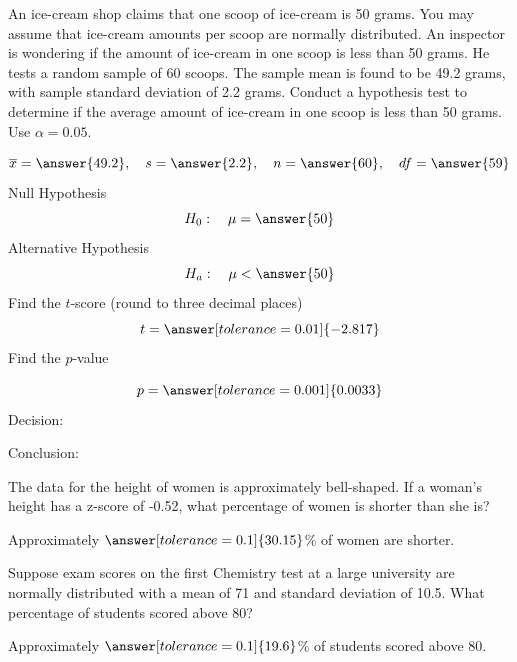 \documentclass{ximera}
\begin{document}
\begin{problem}\label{prob:140finalprob8}
An ice-cream shop claims that one scoop of ice-cream is 50 grams.  You may assume that ice-cream amounts per scoop are normally distributed.  An inspector is wondering if the amount of ice-cream in one scoop is less than 50 grams.  He tests a random sample of 60 scoops.  The sample mean is found to be 49.2 grams, with sample standard deviation of 2.2 grams.  Conduct a hypothesis test to determine if the average amount of ice-cream in one scoop is less than 50 grams.  Use $\alpha=0.05$.

$$\overline{x}=\answer{49.2},\quad s=\answer{2.2},\quad n=\answer{60},\quad df=\answer{59}$$
Null Hypothesis
$$H_0:\quad \mu=\answer{50}$$
Alternative Hypothesis
$$H_a:\quad \mu<\answer{50}$$
Find the $t$-score (round to three decimal places)
$$t=\answer[tolerance=0.01]{-2.817}$$
Find the $p$-value
\begin{center}  
\end{center}
$$p=\answer[tolerance=0.001]{0.0033}$$
Decision:

\begin{multipleChoice} 
\end{multipleChoice}  

Conclusion:

\begin{multipleChoice} 
\end{multipleChoice} 
\end{problem}

\begin{problem}\label{prob:140finalprob9}
The data for the height of women is approximately bell-shaped.  If a woman’s height has a z-score of -0.52, what percentage of women is shorter than she is?

Approximately $\answer[tolerance=0.1]{30.15}$\% of women are shorter.
\end{problem}

\begin{problem}\label{prob:140finalprob10}
Suppose exam scores on the first Chemistry test at a large university are normally distributed with a mean of 71 and standard deviation of 10.5. What percentage of students scored above 80?

Approximately $\answer[tolerance=0.1]{19.6}$\% of students scored above 80.
\end{problem}
\end{document}
